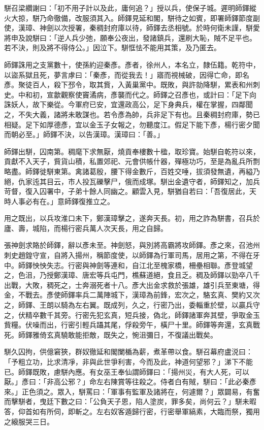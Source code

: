 \begin{pinyinscope}
 駢召梁纘謝曰：「初不用子計以及此，庸何追？」授以兵，使保子城。遲明師鐸縱火大掠，駢乃命徹備，改服須其入。師鐸見延和閣，駢待之如賓，即署師鐸節度副使，漢璋、神劍以次授署，秦稠封府庫以待，師鐸去丞相號。於時何衛未謹，駢愛將申及說駢曰：「逆人兵少弛，願奉公夜出，發諸鎮兵，還刷大恥，賊不足平也。若不決，則及將不得侍公。」因泣下。駢恇怯不能用其策，及乃匿去。



 師鐸誅用之支黨數十，使孫約迎秦彥。彥者，徐州人，本名立，隸伍籍。乾符中，以盜系獄且死，夢言虖曰：「秦彥，而從我去！」寤而視械破，因得亡命，即名彥。聚徒百人，殺下邳令，取其貲，入黃巢黨中。既敗，與許勍降駢，累表和州刺史。中和初，宣歙觀察使竇潏病，彥襲而代之。師鐸之召彥也，或計曰：「足下向誅妖人，故下樂從。今軍府已安，宜還政高公，足下身典兵，權在掌握，四鄰聞之，不失大義，諸將未敢謀也。若令彥為帥，兵非足下有也。且秦稠封府庫，勢已相疑。足下如厚德彥，宜以金玉子女報之，勿聽度江。假足下能下彥，楊行密夕聞而朝必至。」師鐸不決，以告漢璋。漢璋曰：「善。」



 師鐸出駢，囚南第。稠麾下求無厭，燒貢奉樓數十楹，取珍寶。始駢自乾符以來，貢獻不入天子，貲貨山積，私置郊祀、元會供帳什器，殫極功巧，至是為亂兵所剽略盡。師鐸徙駢東第。禽諸葛殷，腰下得金數斤，百姓交唾，拔須發無遺，再縊乃絕，仇家迍其目云，市人投瓦礫擊尸，俄而成塚。駢出金遺守者，師鐸知之，加兵苛督，復入囚署中，子弟十餘人同幽之。顧雲入見，駢猶自若曰：「吾復居此，天時人事必有在。」意師鐸復推立之。



 用之既出，以兵攻淮口未下，鄭漢璋擊之，遂奔天長。初，用之詐為駢書，召兵於廬、壽，城陷，而楊行密兵萬人次天長，用之自歸。



 張神劍求賂於師鐸，辭以彥未至。神劍怒，與別將高霸將攻師鐸。彥之來，召池州刺史趙鍠守宣，自將入揚州，稱節度使，以師鐸為行軍司馬，居用之第，不得在牙中。師鐸怏怏失志。行密與神劍等連和，自江北至槐家橋，柵壘相聯。彥登城望之，色沮，乃授鄭漢璋、唐宏等兵屯門，樵蘇道絕，食且乏。稠及師鐸以勁卒八千出戰，大敗，稠死之，士奔溺死者十八。彥大出金求救於張雄，雄引兵至東塘，得金，不戰去。彥使師鐸率兵二萬陣城下，漢璋為前鋒，宏次之，駱玄真、樊約又次之，師鐸、王朗以騎為左右翼。既成列，久之，行密乃出，委輜重於壁，以贏兵守之，伏精卒數千其旁。行密先犯玄真，短兵接，偽北，師鐸諸軍奔其壁，爭取金玉貲糧。伏噪而出，行密引輕兵躡其尾，俘殺旁午，橫尸十里。師鐸等奔還，玄真戰死。師鐸雅倚玄真驍敢能拒敵，既失之，惋沮彌日，不復議出戰矣。



 駢久囚拘，供億窘狹，群奴徹延和閣闌楯為薪，煮革帶以食。駢召幕府盧涚曰：「予粗立功，比求清凈，非與此世爭利害，今而及此，神道何望邪？」涕下不能已。師鐸既敗，慮駢內應。有女巫王奉仙謂師鐸曰：「揚州災，有大人死，可以厭。」彥曰：「非高公邪？」命左右陳賞等往殺之。侍者白有賊，駢曰：「此必秦彥來。」正色須之。眾入，駢罵曰：「軍事有監軍及諸將在，何遽爾？」眾闢易，有奮而擊駢者，曳廷下數之曰：「公負天子恩，陷人塗炭，罪多矣，尚何云？」駢未暇答，仰首如有所伺，即斬之。左右奴客遁歸行密，行密舉軍縞素，大臨而祭，獨用之縗服哭三日。




\end{pinyinscope}
